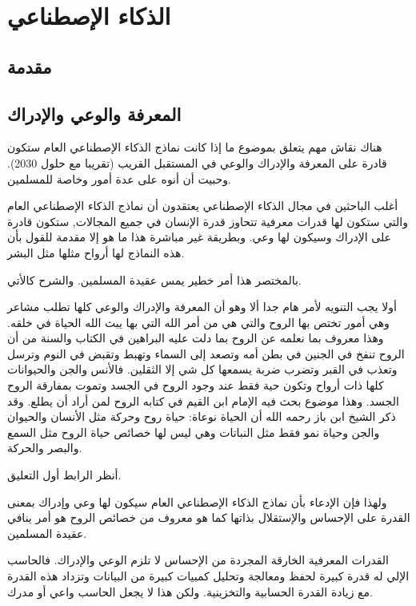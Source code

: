 \chapter{الذكاء الإصطناعي}


\section{مقدمة}





\section{المعرفة والوعي والإدراك}
هناك نقاش مهم يتعلق بموضوع ما إذا كانت نماذج الذكاء الإصطناعي العام ستكون قادرة على المعرفة والإدراك والوعي في المستقبل القريب (تقريبا مع حلول 2030). وحبيت أن أنوه على عدة أمور وخاصة للمسلمين.



أغلب الباحثين في مجال الذكاء الإصطناعي يعتقدون أن نماذج الذكاء الإصطناعي العام والتي ستكون لها قدرات معرفية تتحاوز قدرة الإنسان في جميع المجالات, ستكون قادرة على الإدراك وسيكون لها وعي. وبطريقة غير مباشرة هذا ما هو إلا مقدمة للقول بأن هذه النماذج لها أرواح مثلها مثل البشر.



بالمختصر هذا أمر خطير يمس عقيدة المسلمين. والشرح كالأتي.



أولا يجب التنويه لأمر هام جدا ألا وهو أن المعرفة والإدراك والوعي كلها تطلب مشاعر وهي أمور تختص بها الروح والتي هي من أمر الله التي بها يبث الله الحياة في خلقه. وهذا معروف بما نعلمه عن الروح بما دلت عليه البراهين في الكتاب والسنة من أن الروح تنفخ في الجنين في بطن أمه وتصعد إلى السماء وتهبط وتقبض في النوم وترسل وتعذب في القبر وتضرب ضربة يسمعها كل شي إلا الثقلين. فالأنس والجن والحيوانات كلها ذات أرواح وتكون حية فقط عند وجود الروح في الجسد وتموت بمفارقة الروح الجسد. وهذا موضوع بحث فيه الإمام ابن القيم في كتابه الروح لمن أراد أن يطلع. وقد ذكر الشيخ ابن باز رحمه الله أن الحياة نوعاة: حياة روح وحركة مثل الأنسان والحيوان والجن وحياة نمو فقط مثل النباتات وهي ليس لها خصائص حياة الروح مثل السمع والبصر والحركة.

أنظر الرابط أول التعليق.



ولهذا فإن الإدعاء بأن نماذج الذكاء الإصطناعي العام سيكون لها وعي وإدراك بمعنى القدرة على الإحساس والإستقلال بذاتها كما هو معروف من خصائص الروح هو أمر ينافي عقيدة المسلمين.





القدرات المعرفية الخارقة المجردة من الإحساس لا تلزم الوعي والإدراك. فالحاسب الإلي له قدرة كبيرة لحفظ ومعالجة وتحليل كمبيات كبيرة من البيانات وتزداد هذه القدرة مع زيادة القدرة الحسابية والتخزينية. ولكن هذا لا يجعل الحاسب واعي أو مدرك.